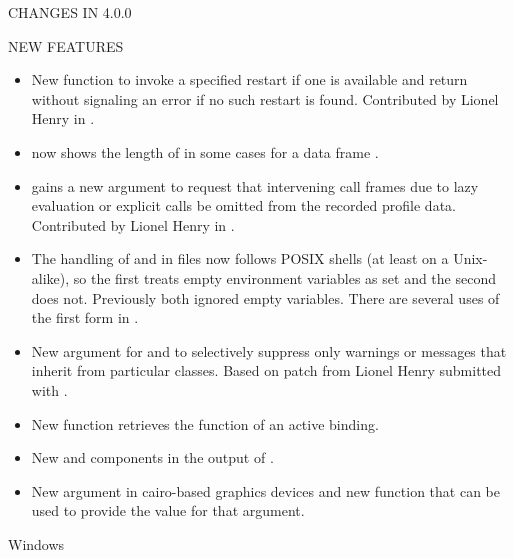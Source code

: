 \documentclass[letterpaper]{book}
\begin{document}
\begin{Section}{ CHANGES IN 4.0.0}
\begin{SubSection}{NEW FEATURES}
\begin{itemize}
\item{} New function  to invoke a specified
restart if one is available and return without signaling an error
if no such restart is found.  Contributed by Lionel Henry in
.

\item{}  now shows the length of  in some
cases for a data frame .

\item{}  gains a new argument 
to request that intervening call frames due to lazy evaluation or
explicit  calls be omitted from the recorded profile
data.  Contributed by Lionel Henry in .

\item{} The handling of  and 
in  files now follows POSIX shells (at least on a
Unix-alike), so the first treats empty environment variables as
set and the second does not.  Previously both ignored empty
variables.  There are several uses of the first form in
.

\item{} New  argument for 
and  to selectively suppress only
warnings or messages that inherit from particular classes.
Based on patch from Lionel Henry submitted with .

\item{} New function  retrieves the
function of an active binding.

\item{} New  and  components in the
output of .

\item{} New argument  in cairo-based graphics
devices and new function  that can be used
to provide the value for that argument.

\end{itemize}


\end{SubSection}


%
\begin{SubSection}{Windows}
\begin{itemize}


\end{itemize}
\end{SubSection}
\end{Section}
\end{document}
